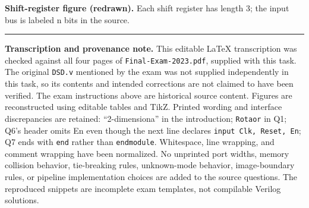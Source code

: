 \documentclass[11pt,a4paper]{article}
\newcommand{\signal}[1]{\texttt{#1}}
\newcommand{\bus}[3]{%
  \draw (#2,#1)--({#2+.13},{#1+.17})--({#2+.87},{#1+.17})--({#2+1},#1)
    --({#2+.87},{#1-.17})--({#2+.13},{#1-.17})--cycle;
  \node[font=\scriptsize] at ({#2+.5},#1) {#3};}
\newcommand{\clockrow}[2]{%
  \node[anchor=east,font=\small] at (-.2,#1) {Clk};
  \foreach \i in {0,...,#2} {
    \draw (\i,#1)--(\i,{#1+.3})--({\i+.5},{#1+.3})--({\i+.5},#1)--({\i+1},#1);}}
\begin{document}
\begin{center}
\end{center}
\textbf{Shift-register figure (redrawn).} Each shift register has length
3; the input bus is labeled n bits in the source.
\begin{center}
\end{center}

\bigskip\hrule\smallskip
\textbf{Transcription and provenance note.} This editable LaTeX
transcription was checked against all four pages of
\signal{Final-Exam-2023.pdf}, supplied with this task. The original
\signal{DSD.v} mentioned by the exam was not supplied independently in
this task, so its contents and intended corrections are not claimed to
have been verified. The exam instructions above are historical source
content. Figures are reconstructed using editable tables and TikZ.
Printed wording and interface discrepancies are retained: ``2-dimensiona''
in the introduction; \signal{Rotaor} in Q1; Q6's header omits En even
though the next line declares \signal{input Clk, Reset, En}; Q7 ends
with \signal{end} rather than \signal{endmodule}. Whitespace, line
wrapping, and comment wrapping have been normalized. No unprinted port
widths, memory collision behavior, tie-breaking rules, unknown-mode
behavior, image-boundary rules, or pipeline implementation choices are
added to the source questions. The reproduced snippets are incomplete
exam templates, not compilable Verilog solutions.
\end{document}

